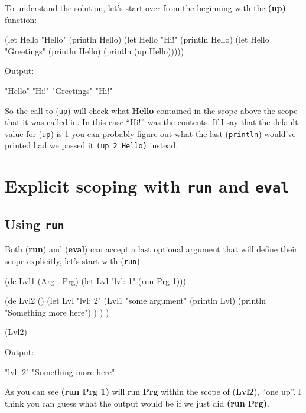 To understand the solution, let's start over from the beginning with the
\textbf{(up)} function:

\begin{wideverbatim}
(let Hello "Hello"
  (println Hello)
  (let Hello "Hi!"
     (println Hello)
     (let Hello "Greetings"
        (println Hello)
        (println (up Hello)))))
\end{wideverbatim}

Output:

\begin{wideverbatim}
"Hello"
"Hi!"
"Greetings"
"Hi!"
\end{wideverbatim}

So the call to (\texttt{up}) will check what \textbf{Hello} contained
in the scope above the scope that it was called in. In this case
``Hi!'' was the contents. If I say that the default value for
(\texttt{up}) is 1 you can probably figure out what the last
(\texttt{println}) would've printed had we passed it \texttt{(up 2
  Hello)} instead.


\section{Explicit scoping with  \texttt{run} and \texttt{eval}}
\label{sec:expl-scope-res-explicit-scoping-with-run}

\subsection{Using \texttt{run}}
\label{sec:expl-scope-res-using-run}

Both (\textbf{run}) and (\textbf{eval}) can accept a last optional
argument that will define their scope explicitly, let's start with
(\texttt{run}):


\begin{wideverbatim}
(de Lvl1 (Arg . Prg)
  (let Lvl "lvl: 1"
     (run Prg 1)))

(de Lvl2 ()
  (let Lvl "lvl: 2"
     (Lvl1 "some argument"
        (println Lvl) (println "Something more here") ) ) )
  
(Lvl2)
\end{wideverbatim}

Output:

\begin{wideverbatim}
"lvl: 2"
"Something more here"
\end{wideverbatim}

As you can see \textbf{(run Prg 1)} will run \textbf{Prg} within the scope of
(\textbf{Lvl2}), ``one up''. I think you can guess what the output would be if we
just did \textbf{(run Prg)}.

